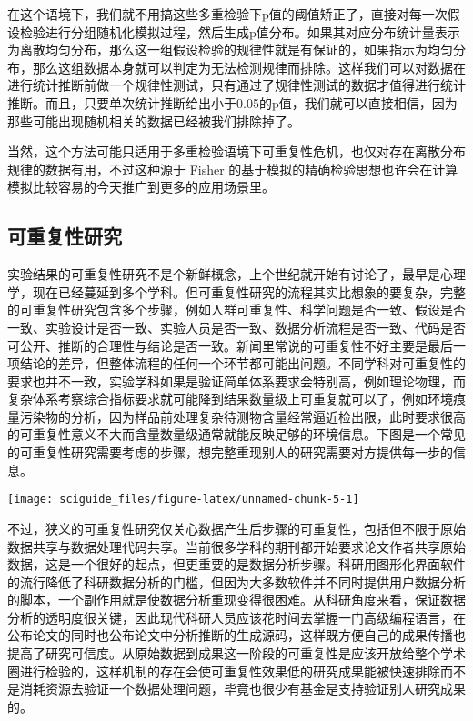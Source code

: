 \documentclass[]{tufte-book}
\begin{document}
在这个语境下，我们就不用搞这些多重检验下p值的阈值矫正了，直接对每一次假设检验进行分组随机化模拟过程，然后生成p值分布。如果其对应分布统计量表示为离散均匀分布，那么这一组假设检验的规律性就是有保证的，如果指示为均匀分布，那么这组数据本身就可以判定为无法检测规律而排除。这样我们可以对数据在进行统计推断前做一个规律性测试，只有通过了规律性测试的数据才值得进行统计推断。而且，只要单次统计推断给出小于0.05的p值，我们就可以直接相信，因为那些可能出现随机相关的数据已经被我们排除掉了。

当然，这个方法可能只适用于多重检验语境下可重复性危机，也仅对存在离散分布规律的数据有用，不过这种源于 Fisher 的基于模拟的精确检验思想也许会在计算模拟比较容易的今天推广到更多的应用场景里。

\hypertarget{ux53efux91cdux590dux6027ux7814ux7a76}{%
\subsection{可重复性研究}\label{ux53efux91cdux590dux6027ux7814ux7a76}}

实验结果的可重复性研究不是个新鲜概念，上个世纪就开始有讨论了，最早是心理学，现在已经蔓延到多个学科。但可重复性研究的流程其实比想象的要复杂，完整的可重复性研究包含多个步骤，例如人群可重复性、科学问题是否一致、假设是否一致、实验设计是否一致、实验人员是否一致、数据分析流程是否一致、代码是否可公开、推断的合理性与结论是否一致。新闻里常说的可重复性不好主要是最后一项结论的差异，但整体流程的任何一个环节都可能出问题。不同学科对可重复性的要求也并不一致，实验学科如果是验证简单体系要求会特别高，例如理论物理，而复杂体系考察综合指标要求就可能降到结果数量级上可重复就可以了，例如环境痕量污染物的分析，因为样品前处理复杂待测物含量经常逼近检出限，此时要求很高的可重复性意义不大而含量数量级通常就能反映足够的环境信息。下图是一个常见的可重复性研究需要考虑的步骤，想完整重现别人的研究需要对方提供每一步的信息。

\texttt{[image: sciguide\_files/figure-latex/unnamed-chunk-5-1]}

不过，狭义的可重复性研究仅关心数据产生后步骤的可重复性，包括但不限于原始数据共享与数据处理代码共享。当前很多学科的期刊都开始要求论文作者共享原始数据，这是一个很好的起点，但更重要的是数据分析步骤。科研用图形化界面软件的流行降低了科研数据分析的门槛，但因为大多数软件并不同时提供用户数据分析的脚本，一个副作用就是使数据分析重现变得很困难。从科研角度来看，保证数据分析的透明度很关键，因此现代科研人员应该花时间去掌握一门高级编程语言，在公布论文的同时也公布论文中分析推断的生成源码，这样既方便自己的成果传播也提高了研究可信度。从原始数据到成果这一阶段的可重复性是应该开放给整个学术圈进行检验的，这样机制的存在会使可重复性效果低的研究成果能被快速排除而不是消耗资源去验证一个数据处理问题，毕竟也很少有基金是支持验证别人研究成果的。
\end{document}
